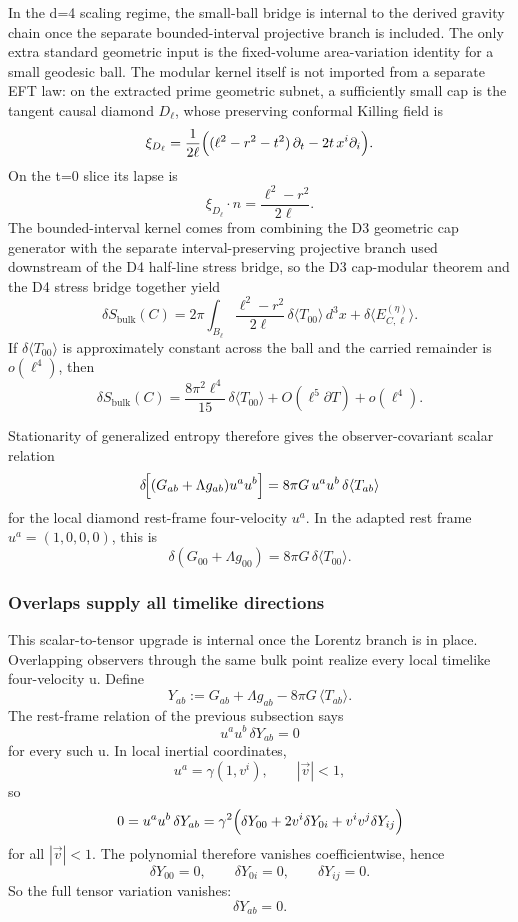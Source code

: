 In the d=4 scaling regime, the small-ball bridge is internal to the derived gravity chain once the separate bounded-interval projective branch is included. The only extra standard geometric input is the fixed-volume area-variation identity for a small geodesic ball. The modular kernel itself is not imported from a separate EFT law: on the extracted prime geometric subnet, a sufficiently small cap is the tangent causal diamond \(D_\ell\), whose preserving conformal Killing field is
\[
\xi_{D_\ell}
=
\frac{1}{2\ell}
\Bigl((\ell^2-r^2-t^2)\,\partial_t-2t\,x^i\partial_i\Bigr).
\]
On the t=0 slice its lapse is
\[
\xi_{D_\ell}\!\cdot n=\frac{\ell^2-r^2}{2\ell}.
\]
The bounded-interval kernel comes from combining the D3 geometric cap generator with the separate interval-preserving projective branch used downstream of the D4 half-line stress bridge, so the D3 cap-modular theorem and the D4 stress bridge together yield
\[
\delta S_{\mathrm{bulk}}(C)
=
2\pi\int_{B_\ell}\frac{\ell^2-r^2}{2\ell}\,\delta\langle T_{00}\rangle\,d^3x
+
\delta\langle E^{(\eta)}_{C,\ell}\rangle.
\]
If \(\delta\langle T_{00}\rangle\) is approximately constant across the ball and the carried remainder is \(o(\ell^4)\), then
\[
\delta S_{\mathrm{bulk}}(C)
=
\frac{8\pi^2\ell^4}{15}\,\delta\langle T_{00}\rangle
+O(\ell^5\partial T)+o(\ell^4).
\]

Stationarity of generalized entropy therefore gives the observer-covariant scalar relation
\[
\delta\!\Bigl[(G_{ab}+\Lambda g_{ab})u^a u^b\Bigr]
=
8\pi G\,u^a u^b\,\delta\langle T_{ab}\rangle
\]
for the local diamond rest-frame four-velocity \(u^a\). In the adapted rest frame \(u^a=(1,0,0,0)\), this is
\[
\delta\!\left(G_{00}+\Lambda g_{00}\right)=8\pi G\,\delta\langle T_{00}\rangle.
\]

\subsubsection{Overlaps supply all timelike directions}\label{57-overlaps-supply-all-timelike-directions}

This scalar-to-tensor upgrade is internal once the Lorentz branch is in place. Overlapping observers through the same bulk point realize every local timelike four-velocity u. Define
\[
Y_{ab}:=G_{ab}+\Lambda g_{ab}-8\pi G\,\langle T_{ab}\rangle.
\]
The rest-frame relation of the previous subsection says
\[
u^a u^b\,\delta Y_{ab}=0
\]
for every such u. In local inertial coordinates,
\[
u^a=\gamma(1,v^i),
\qquad
|\vec v|<1,
\]
so
\[
0
=
u^a u^b\,\delta Y_{ab}
=
\gamma^2\Bigl(\delta Y_{00}+2v^i\delta Y_{0i}+v^iv^j\delta Y_{ij}\Bigr)
\]
for all \(|\vec v|<1\). The polynomial therefore vanishes coefficientwise, hence
\[
\delta Y_{00}=0,\qquad
\delta Y_{0i}=0,\qquad
\delta Y_{ij}=0.
\]
So the full tensor variation vanishes:
\[
\delta Y_{ab}=0.
\]

